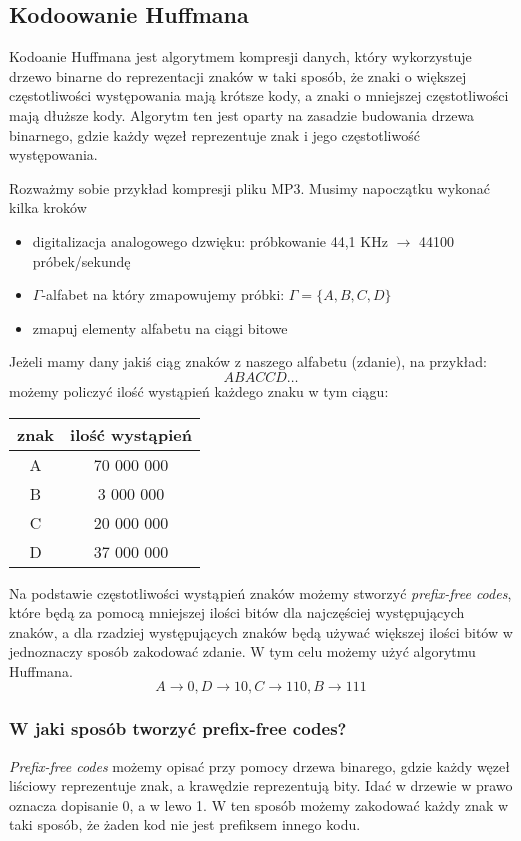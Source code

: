 \documentclass[11pt,a4paper]{article}
\begin{document}
\subsection{Kodoowanie Huffmana}
Kodoanie Huffmana jest algorytmem kompresji danych, który wykorzystuje drzewo binarne do reprezentacji znaków w taki sposób, że znaki o większej częstotliwości występowania mają krótsze kody, a znaki o mniejszej częstotliwości mają dłuższe kody. Algorytm ten jest oparty na zasadzie budowania drzewa binarnego, gdzie każdy węzeł reprezentuje znak i jego częstotliwość występowania.

Rozważmy sobie przykład kompresji pliku MP3. Musimy napoczątku wykonać kilka kroków
\begin{itemize}
    \item digitalizacja analogowego dzwięku: próbkowanie 44,1 KHz $\rightarrow$ 44100 próbek/sekundę
    \item $\Gamma$-alfabet na który zmapowujemy próbki: $\Gamma = \{A,B,C,D\}$
    \item zmapuj elementy alfabetu na ciągi bitowe
\end{itemize}

Jeżeli mamy dany jakiś ciąg znaków z naszego alfabetu (zdanie), na przykład:
\[
    ABACCD\dots
\]
możemy policzyć ilość wystąpień każdego znaku w tym ciągu:
\begin{center}
    \begin{tabular}{|c|c|}
        \hline
        znak & ilość wystąpień \\
        \hline
        A & 70 000 000 \\
        B & 3 000 000 \\
        C & 20 000 000 \\
        D & 37 000 000 \\
        \hline
    \end{tabular}
\end{center}
Na podstawie częstotliwości wystąpień znaków możemy stworzyć \textit{prefix-free codes}, które będą za pomocą mniejszej ilości bitów dla najczęściej występujących znaków, a dla rzadziej występujących znaków będą używać większej ilości bitów w jednoznaczy sposób zakodować zdanie. W tym celu możemy użyć algorytmu Huffmana.
\[
    A\rightarrow 0, D\rightarrow 10, C\rightarrow 110, B\rightarrow 111
\]

\subsubsection{W jaki sposób tworzyć prefix-free codes?}
\textit{Prefix-free codes} możemy opisać przy pomocy drzewa binarego, gdzie każdy węzeł liściowy reprezentuje znak, a krawędzie reprezentują bity. Idać w drzewie w prawo oznacza dopisanie 0, a w lewo 1. W ten sposób możemy zakodować każdy znak w taki sposób, że żaden kod nie jest prefiksem innego kodu.
\end{document}
